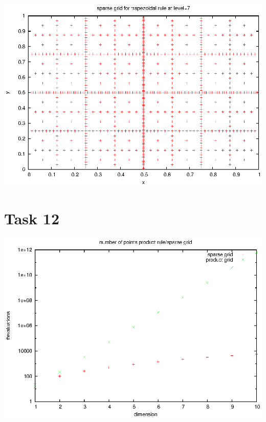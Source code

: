 \documentclass[]{article}
\begin{document}
\includegraphics{task11_trap_7}\\

\section*{Task 12}
\includegraphics{task12}\\
\end{document}
